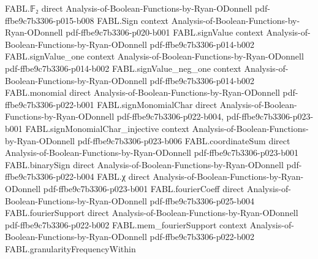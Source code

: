 \begin{theorem}
\label{FABL.indexedFourierCoeff_restrictionFourierCoeff}
\leanok
{}
\proofstep
  {FABL.𝔽₂}
  {direct}
  {Analysis-of-Boolean-Functions-by-Ryan-ODonnell}
  {pdf-ffbe9c7b3306-p015-b008}
\proofstep
  {FABL.Sign}
  {context}
  {Analysis-of-Boolean-Functions-by-Ryan-ODonnell}
  {pdf-ffbe9c7b3306-p020-b001}
\proofstep
  {FABL.signValue}
  {context}
  {Analysis-of-Boolean-Functions-by-Ryan-ODonnell}
  {pdf-ffbe9c7b3306-p014-b002}
\proofstep
  {FABL.signValue_one}
  {context}
  {Analysis-of-Boolean-Functions-by-Ryan-ODonnell}
  {pdf-ffbe9c7b3306-p014-b002}
\proofstep
  {FABL.signValue_neg_one}
  {context}
  {Analysis-of-Boolean-Functions-by-Ryan-ODonnell}
  {pdf-ffbe9c7b3306-p014-b002}
\proofstep
  {FABL.monomial}
  {direct}
  {Analysis-of-Boolean-Functions-by-Ryan-ODonnell}
  {pdf-ffbe9c7b3306-p022-b001}
\proofstep
  {FABL.signMonomialChar}
  {direct}
  {Analysis-of-Boolean-Functions-by-Ryan-ODonnell}
  {pdf-ffbe9c7b3306-p022-b004,
    pdf-ffbe9c7b3306-p023-b001}
\proofstep
  {FABL.signMonomialChar_injective}
  {context}
  {Analysis-of-Boolean-Functions-by-Ryan-ODonnell}
  {pdf-ffbe9c7b3306-p023-b006}
\proofstep
  {FABL.coordinateSum}
  {direct}
  {Analysis-of-Boolean-Functions-by-Ryan-ODonnell}
  {pdf-ffbe9c7b3306-p023-b001}
\proofstep
  {FABL.binarySign}
  {direct}
  {Analysis-of-Boolean-Functions-by-Ryan-ODonnell}
  {pdf-ffbe9c7b3306-p022-b004}
\proofstep
  {FABL.χ}
  {direct}
  {Analysis-of-Boolean-Functions-by-Ryan-ODonnell}
  {pdf-ffbe9c7b3306-p023-b001}
\proofstep
  {FABL.fourierCoeff}
  {direct}
  {Analysis-of-Boolean-Functions-by-Ryan-ODonnell}
  {pdf-ffbe9c7b3306-p025-b004}
\proofstep
  {FABL.fourierSupport}
  {direct}
  {Analysis-of-Boolean-Functions-by-Ryan-ODonnell}
  {pdf-ffbe9c7b3306-p022-b002}
\proofstep
  {FABL.mem_fourierSupport}
  {context}
  {Analysis-of-Boolean-Functions-by-Ryan-ODonnell}
  {pdf-ffbe9c7b3306-p022-b002}
\proofstep
  {FABL.granularityFrequencyWithin}

\end{theorem}
